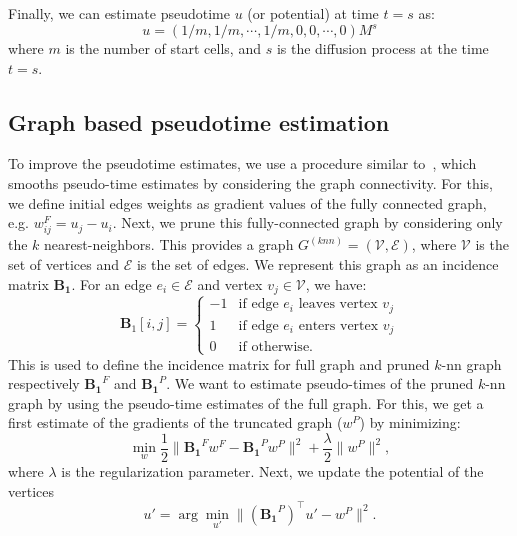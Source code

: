 Finally, we can estimate pseudotime $u$ (or potential) at time $t=s$ as:
\begin{equation}
\label{eqn:potential}
u = (1/m, 1/m,\cdots, 1/m, 0,0,\cdots,0)M^{s}
\end{equation}
\noindent where $m$ is the number of start cells, and $s$ is the diffusion process at the time $t=s$.


\subsection{Graph based pseudotime estimation}

To improve the pseudotime estimates, we use a procedure similar to~\cite{maehara2019ddhodge}, which smooths pseudo-time estimates by considering the graph connectivity. For this, we define initial edges weights as gradient values of the fully connected graph, e.g. $w^{F}_{ij}=u_j - u_i$. Next, we prune this fully-connected graph by considering only the $k$ nearest-neighbors. This provides a graph $G^{(knn)}=(\mathcal{V}, \mathcal{E})$, where $\mathcal{V}$ is the set of vertices and $\mathcal{E}$ is the set of edges.
We represent this graph as an incidence matrix $\mathbf{B_1}$. For an edge $e_i \in \mathcal{E}$ and vertex $v_j \in \mathcal{V}$, we have:
\begin{equation}
\label{eqn:incidencematrix}
\mathbf{B}_1[i,j] = \begin{cases}
-1 &\text{if edge } e_i \text{ leaves  vertex }v_j \\
1 &\text{if edge } e_i \text{ enters  vertex }v_j \\
0 &\text{if otherwise}.
\end{cases}
\end{equation}
This is used to define the incidence matrix for full graph and pruned $k$-nn graph respectively $\mathbf{B_1}^F$ and $\mathbf{B_1}^P$.
\noindent We want to estimate pseudo-times of the pruned $k$-nn graph by using the pseudo-time estimates of the full graph. For this, we get a first estimate of the gradients of the truncated graph ($w^P$) by minimizing:
\begin{equation}
\label{eqn:transitionmatrix}
    \min_{w}\frac{1}{2}\|\mathbf{B_1}^F w^F - \mathbf{B_1}^P w^P\|^2 + \frac{\lambda}{2}\|w^P\|^2,
\end{equation}
\noindent where $\lambda$ is the regularization parameter. Next, we update the potential of the vertices
\begin{equation}
  u' = \arg\underset{u'}{\min}\|(\mathbf{B_1}^P)^\top u' - w^P\|^2.
\end{equation}
